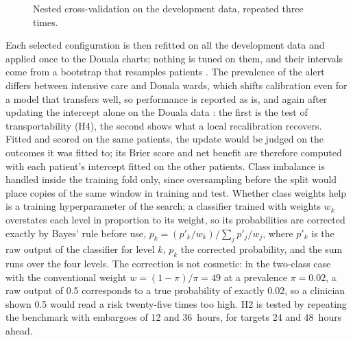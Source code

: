 \documentclass[11pt,a4paper,oneside]{report}
\begin{document}
\begin{figure}[htbp]
\centering
{}
\caption{Nested cross-validation on the development data, repeated three times.}\label{fig:nested-cv}
\end{figure}

Each selected configuration is then refitted on all the development data and applied once to the Douala charts; nothing is tuned on them, and their intervals come from a bootstrap that resamples patients \parencite{collins2016}. The prevalence of the alert differs between intensive care and Douala wards, which shifts calibration even for a model that transfers well, so performance is reported as is, and again after updating the intercept alone on the Douala data \parencite{janssen2008}: the first is the test of transportability (H4), the second shows what a local recalibration recovers. Fitted and scored on the same patients, the update would be judged on the outcomes it was fitted to; its Brier score and net benefit are therefore computed with each patient's intercept fitted on the other patients. Class imbalance is handled inside the training fold only, since oversampling before the split would place copies of the same window in training and test. Whether class weights help is a training hyperparameter of the search; a classifier trained with weights $w_k$ overstates each level in proportion to its weight, so its probabilities are corrected exactly by Bayes' rule before use, $p_k = (p'_k/w_k) / \sum_j p'_j/w_j$, where $p'_k$ is the raw output of the classifier for level $k$, $p_k$ the corrected probability, and the sum runs over the four levels. The correction is not cosmetic: in the two-class case with the conventional weight $w = (1-\pi)/\pi = 49$ at a prevalence $\pi = 0.02$, a raw output of 0.5 corresponds to a true probability of exactly 0.02, so a clinician shown 0.5 would read a risk twenty-five times too high. H2 is tested by repeating the benchmark with embargoes of 12 and 36~hours, for targets 24 and 48~hours ahead.
\end{document}
